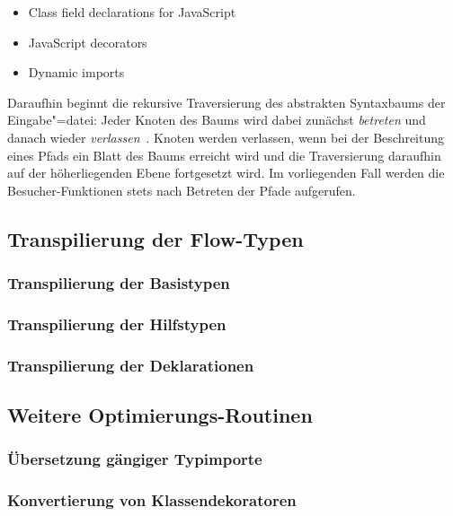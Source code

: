 \begin{itemize}
  \item Class field declarations for JavaScript~\autocite{ES_PROPOSAL:CLASS_FIELDS}
  \item JavaScript decorators~\autocite{ES_PROPOSAL:DECORATORS}
  \item Dynamic imports~\autocite{ES_PROPOSAL:DYNAMIC_IMPORTS}
\end{itemize}

Daraufhin beginnt die rekursive Traversierung des abstrakten Syntaxbaums der Eingabe"=datei: Jeder Knoten des Baums wird dabei zunächst \textit{betreten} und danach wieder \textit{verlassen}~\autocite{BABEL_HANDBOOK}. Knoten werden verlassen, wenn bei der Beschreitung eines Pfads ein Blatt des Baums erreicht wird und die Traversierung daraufhin auf der höherliegenden Ebene fortgesetzt wird. Im vorliegenden Fall werden die Besucher-Funktionen stets nach Betreten der Pfade aufgerufen.


\subsection{Transpilierung der Flow-Typen}
  \subsubsection{Transpilierung der Basistypen}
  \subsubsection{Transpilierung der Hilfstypen}
  \subsubsection{Transpilierung der Deklarationen}

\subsection{Weitere Optimierungs-Routinen}
  \subsubsection{Übersetzung gängiger Typimporte}
  \subsubsection{Konvertierung von Klassendekoratoren}
  \label{subsec:class-decorators}

